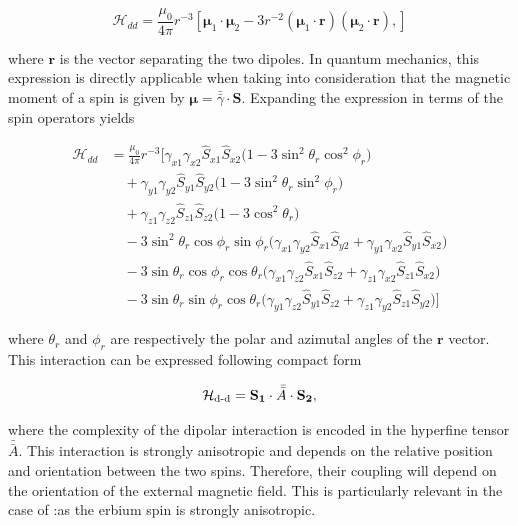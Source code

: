 \begin{equation}
    \mathcal{H}_{dd} = \frac{\mu_0}{4\pi} r^{-3} 
    \left[ \boldsymbol{\mu}_1 \cdot \boldsymbol{\mu}_2 
    - 3r^{-2} (\boldsymbol{\mu}_1 \cdot \mathbf{r})(\boldsymbol{\mu}_2 \cdot \mathbf{r}), \right]
\end{equation}

\noindent where $\mathbf{r}$ is the vector separating the two dipoles. In quantum mechanics, this expression is directly applicable when taking into consideration that the magnetic moment of a spin is given by $\boldsymbol{\mu} = \bar{\bar{\gamma}} \cdot \mathbf{S}$. Expanding the expression in terms of the spin operators yields

\begin{equation}
\begin{aligned}
\mathcal{H}_{dd} &= 
\frac{\mu_0}{4\pi} r^{-3} \Big[ 
\gamma_{x1}\gamma_{x2} \hat{S}_{x1} \hat{S}_{x2} \big( 1 - 3 \sin^2 \theta_r \cos^2 \phi_r \big) \\
&\quad + \gamma_{y1}\gamma_{y2} \hat{S}_{y1} \hat{S}_{y2} \big( 1 - 3 \sin^2 \theta_r \sin^2 \phi_r \big) \\
&\quad + \gamma_{z1}\gamma_{z2} \hat{S}_{z1} \hat{S}_{z2} \big( 1 - 3 \cos^2 \theta_r \big) \\
&\quad - 3 \sin^2 \theta_r \cos \phi_r \sin \phi_r 
\big( \gamma_{x1}\gamma_{y2} \hat{S}_{x1} \hat{S}_{y2} + \gamma_{y1}\gamma_{x2} \hat{S}_{y1} \hat{S}_{x2} \big) \\
&\quad - 3 \sin \theta_r \cos \phi_r \cos \theta_r 
\big( \gamma_{x1}\gamma_{z2} \hat{S}_{x1} \hat{S}_{z2} + \gamma_{z1}\gamma_{x2} \hat{S}_{z1} \hat{S}_{x2} \big) \\
&\quad - 3 \sin \theta_r \sin \phi_r \cos \theta_r 
\big( \gamma_{y1}\gamma_{z2} \hat{S}_{y1} \hat{S}_{z2} + \gamma_{z1}\gamma_{y2} \hat{S}_{z1} \hat{S}_{y2} \big) 
\Big]
\end{aligned}
\end{equation}

\noindent where $\theta_r$ and $\phi_r$ are respectively the polar and azimutal angles of the $\mathbf{r}$ vector. This interaction can be expressed following compact form

\begin{equation}
    \mathcal{H}_{\text{d-d}} = \mathbf{S_1} \cdot \bar{\bar {A}} \cdot \mathbf{S_2},
\end{equation}

\noindent where the complexity of the dipolar interaction is encoded in the hyperfine tensor $\bar{\bar{A}}$. This interaction is strongly anisotropic and depends on the relative position and orientation between the two spins. Therefore, their coupling will depend on the orientation of the external magnetic field. This is particularly relevant in the case of \Er:\Ca as the erbium spin is strongly anisotropic. 

